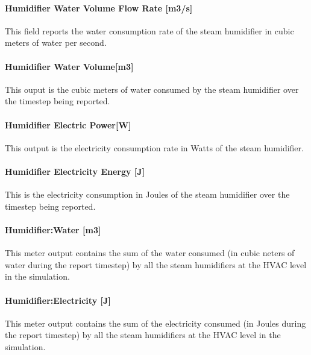 \paragraph{Humidifier Water Volume Flow Rate {[}m3/s{]}}\label{humidifier-water-volume-flow-rate-m3s}

This field reports the water consumption rate of the steam humidifier in cubic meters of water per second.

\paragraph{Humidifier Water Volume{[}m3{]}}\label{humidifier-water-volumem3}

This ouput is the cubic meters of water consumed by the steam humidifier over the timestep being reported.

\paragraph{Humidifier Electric Power{[}W{]}}\label{humidifier-electric-powerw}

This output is the electricity consumption rate in Watts of the steam humidifier.

\paragraph{Humidifier Electricity Energy {[}J{]}}\label{humidifier-electric-energy-j}

This is the electricity consumption in Joules of the steam humidifier over the timestep being reported.

\paragraph{Humidifier:Water {[}m3{]}}\label{humidifierwater-m3}

This meter output contains the sum of the water consumed (in cubic neters of water during the report timestep) by all the steam humidifiers at the HVAC level in the simulation.

\paragraph{Humidifier:Electricity {[}J{]}}\label{humidifierelectricity-j}

This meter output contains the sum of the electricity consumed (in Joules during the report timestep) by all the steam humidifiers at the HVAC level in the simulation.

